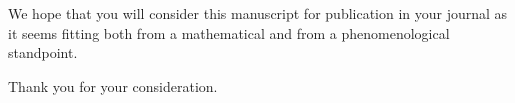 \documentclass[11pt,a4paper,roman]{moderncv}
\begin{document}
We hope that you will consider this manuscript for publication in your journal as it seems fitting both from a mathematical and from a phenomenological standpoint. 

Thank you for your consideration.

\makeletterclosing





\end{document}
